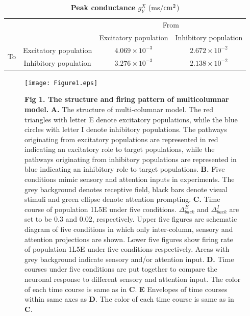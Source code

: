 \documentclass[10pt,letterpaper]{article}
\begin{document}
\begin{table}[!ht]
\centering
\caption{
{\bf Peak conductance $g_{Y}^{X}$} (ms/$\rm cm^{2}$)}
\begin{tabular}[t]{cccc}
\toprule
&&\multicolumn{2}{c}{From} \\
&& Excitatory population & Inhibitory population \\
\midrule
\multirow{2}{*}{To} & \multicolumn{1}{c|}{Excitatory population} & $4.069\times10^{-3}$ & $2.672\times10^{-2}$ \\
&\multicolumn{1}{c|}{Inhibitory population} & $3.276\times10^{-3}$ & $2.138\times10^{-2}$ \\ %
\bottomrule
\end{tabular}
\label{table4}
\end{table}


\begin{figure}[!h]
\begin{adjustwidth}{-2in}{0.3in} %
\centering
\texttt{[image: Figure1.eps]}
\begin{flushleft} {\bf Fig 1. The structure and firing pattern of multicolumnar model.}
{\bf A.} The structure of multi-columnar model. The red triangles with letter E denote excitatory populations, while the blue circles with letter I denote inhibitory populations. The pathways originating from excitatory populations are represented in red indicating an excitatory role to target populations, while the pathways originating from inhibitory populations are represented in blue indicating an inhibitory role to target populations. \textbf{B.} Five conditions mimic sensory and attention inputs in experiments. The grey background denotes receptive field, black bars denote visual stimuli and green ellipse denote attention prompting. \textbf{C.} Time course of population 1L5E under five conditions. $\Delta_{back}^{E}$ and $\Delta_{back}^{I}$ are set to be 0.3 and 0.02, respectively. Upper five figures are schematic diagram of five conditions in which only inter-column, sensory and attention projections are shown. Lower five figures show firing rate of population 1L5E under five conditions respectively. Areas with grey background indicate sensory and/or attention input. \textbf{D.} Time courses under five conditions are put together to compare the neuronal response to different sensory and attention input. The color of each time course is same as in \textbf{C}. \textbf{E} Envelopes of time courses within same axes as \textbf{D}. The color of each time course is same as in \textbf{C}.
\end{flushleft}
\hypertarget{fig:fig1}{}
\end{adjustwidth}
\end{figure}
\end{document}
